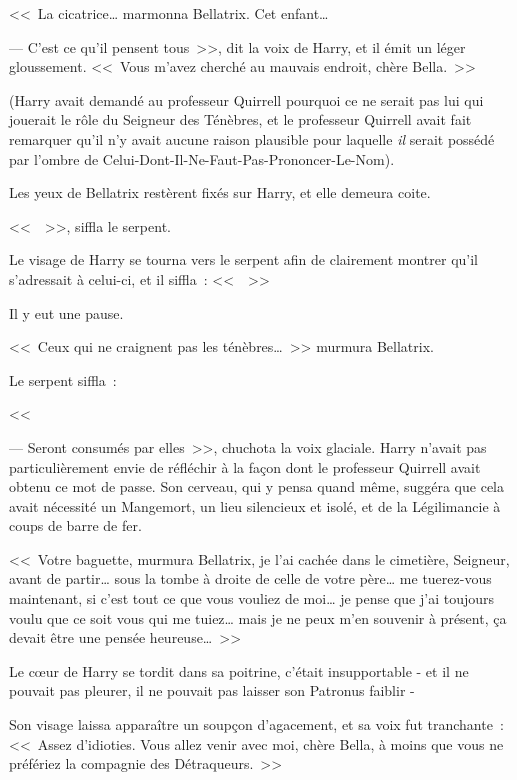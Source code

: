 <<~La cicatrice… marmonna Bellatrix. Cet enfant…

--- C'est ce qu'il pensent tous~>>, dit la voix de Harry, et il émit un léger gloussement. <<~Vous m'avez cherché au mauvais endroit, chère Bella.~>>

(Harry avait demandé au professeur Quirrell pourquoi ce ne serait pas lui qui jouerait le rôle du Seigneur des Ténèbres, et le professeur Quirrell avait fait remarquer qu'il n'y avait aucune raison plausible pour laquelle \emph{il} serait possédé par l'ombre de Celui-Dont-Il-Ne-Faut-Pas-Prononcer-Le-Nom).

Les yeux de Bellatrix restèrent fixés sur Harry, et elle demeura coite.

<<~~>>, siffla le serpent.

Le visage de Harry se tourna vers le serpent afin de clairement montrer qu'il s'adressait à celui-ci, et il siffla~: <<~~>>

Il y eut une pause.

<<~Ceux qui ne craignent pas les ténèbres…~>> murmura Bellatrix.

Le serpent siffla~:

<<~

--- Seront consumés par elles~>>, chuchota la voix glaciale. Harry n'avait pas particulièrement envie de réfléchir à la façon dont le professeur Quirrell avait obtenu ce mot de passe. Son cerveau, qui y pensa quand même, suggéra que cela avait nécessité un Mangemort, un lieu silencieux et isolé, et de la Légilimancie à coups de barre de fer.

<<~Votre baguette, murmura Bellatrix, je l'ai cachée dans le cimetière, Seigneur, avant de partir… sous la tombe à droite de celle de votre père… me tuerez-vous maintenant, si c'est tout ce que vous vouliez de moi… je pense que j'ai toujours voulu que ce soit vous qui me tuiez… mais je ne peux m'en souvenir à présent, ça devait être une pensée heureuse…~>>

Le cœur de Harry se tordit dans sa poitrine, c'était insupportable - et il ne pouvait pas pleurer, il ne pouvait pas laisser son Patronus faiblir -

Son visage laissa apparaître un soupçon d'agacement, et sa voix fut tranchante~: <<~Assez d'idioties. Vous allez venir avec moi, chère Bella, à moins que vous ne préfériez la compagnie des Détraqueurs.~>>


